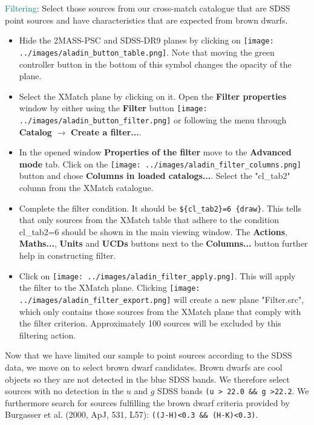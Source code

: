 \documentclass [a4paper, 12pt]{article}
\begin{document}
\noindent \textcolor{teal}{Filtering}: Select those sources from our
cross-match catalogue that are SDSS point sources and have characteristics that
are expected from brown dwarfs.
\begin{itemize}
    \item Hide the 2MASS-PSC and SDSS-DR9 planes by clicking on
    \texttt{[image: ../images/aladin\_button\_table.png]}. Note that moving the green
    controller button in the bottom of this symbol changes the opacity of the
    plane.
    \item Select the XMatch plane by clicking on it. Open the \textbf{Filter
    properties} window by either using the \textbf{Filter} button
    \texttt{[image: ../images/aladin\_button\_filter.png]} or following the menu
    through \textbf{Catalog} $\rightarrow$ \textbf{Create a filter...}.
    \item In the opened window \textbf{Properties of the filter} move to the
    \textbf{Advanced mode} tab. Click on the \texttt{[image: ../images/aladin\_filter\_columns.png]} button and chose
    \textbf{Columns in loaded catalogs...}. Select the "cl\_tab2" column from
    the XMatch catalogue.
    \item Complete the filter condition. It should be \texttt{\$\{cl\_tab2\}=6
    \{draw\}}. This tells \aladin\, that only sources from the XMatch table
    that adhere to the condition cl\_tab2=6 should be shown in the main viewing
    window. The
    \textbf{Actions}, \textbf{Maths...}, \textbf{Units} and \textbf{UCDs}
    buttons next to the \textbf{Columns...} button further help in constructing
    filter.
    \item Click on \texttt{[image: ../images/aladin\_filter\_apply.png]}. This will apply the filter
    to the XMatch plane. Clicking \texttt{[image: ../images/aladin\_filter\_export.png]} will create a new plane
    "Filter.src", which only contains those sources from the XMatch plane that
    comply with the filter criterion. Approximately 100 sources will be
    excluded by this filtering action.
\end{itemize}

Now that we have limited our sample to point sources according to the
SDSS data, we move on to select brown dwarf candidates. Brown dwarfs are
cool objects so they are not detected in the blue SDSS bands. We therefore
select sources with no detection in the $u$ and $g$ SDSS bands \texttt{(u >
22.0 \&\& g >22.2}. We furthermore search for sources fulfilling the brown
dwarf criteria provided by Burgasser et al. (2000, ApJ, 531, L57):
\texttt{((J-H)<0.3 \&\& (H-K)<0.3)}.
\end{document}
